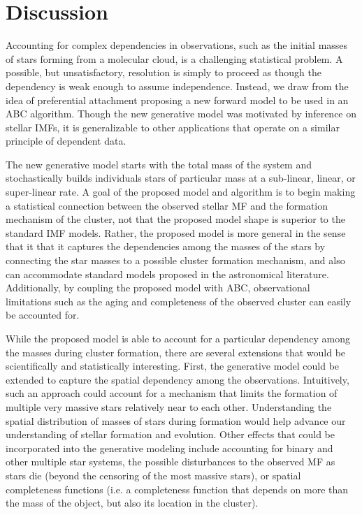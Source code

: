 \documentclass[12pt]{article}
\begin{document}
\section{Discussion}
\label{discussionSec}

Accounting for complex dependencies in observations, such as the initial masses of stars forming from a molecular cloud, is a challenging statistical problem.  A possible, but unsatisfactory, resolution is simply to proceed as though the dependency is weak enough to assume independence.  Instead, we draw from the idea of preferential attachment proposing a new forward model to be used in an ABC algorithm.  
Though the new generative model was motivated by inference on stellar IMFs, it is generalizable to other applications that operate on a similar principle of dependent data.

The new generative model starts with the total mass of the system and stochastically builds individuals stars of particular mass at a sub-linear, linear, or super-linear rate.  
%
A goal of the proposed model and algorithm is to begin making a statistical connection between the observed stellar MF and the formation mechanism of the cluster, not that the proposed model shape is superior to the standard IMF models.  Rather, the proposed model is more general in the sense that it 
 that it captures the dependencies among the masses of the stars by connecting the star masses to a possible cluster formation mechanism, and also can accommodate standard models proposed in the astronomical literature.
Additionally, by coupling the proposed model with ABC, observational limitations such as the aging and completeness of the observed cluster can easily be accounted for.


While the proposed model is able to account for a particular dependency among the masses during cluster formation, there are several extensions that would be scientifically and statistically interesting.   First, the generative model could be extended to capture the spatial dependency among the observations.
Intuitively, such an approach could account for a mechanism that limits the formation of multiple very massive stars relatively near to each other.  
%
Understanding the spatial distribution of masses of stars during formation would help advance our understanding of stellar formation and evolution.  
%
Other effects that could be incorporated into the generative modeling include accounting for binary and other multiple star systems, the possible disturbances to the observed MF as stars die (beyond the censoring of the most massive stars), or spatial completeness functions (i.e. a completeness function that depends on more than the mass of the object, but also its location in the cluster).  
\end{document}
